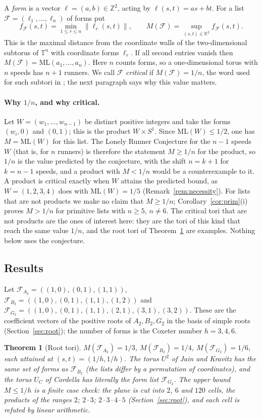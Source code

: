 \documentclass[11pt]{amsart}
\newtheorem{theorem}{Theorem}
\theoremstyle{definition}
\theoremstyle{remark}
\newcommand{\R}{\mathbb{R}}
\newcommand{\Z}{\mathbb{Z}}
\newcommand{\T}{\mathbb{T}}
\newcommand{\dist}[1]{\lVert #1\rVert}
\newcommand{\ML}{\mathrm{ML}}
\begin{document}
A \emph{form} is a vector $\ell=(a,b)\in\Z^2$, acting by $\ell(s,t)=as+bt$. For a list $\mathcal F=(\ell_1,\dots,\ell_n)$ of forms put
\[
f_{\mathcal F}(s,t)=\min_{1\le r\le n}\dist{\ell_r(s,t)},\qquad M(\mathcal F)=\sup_{(s,t)\in\R^2} f_{\mathcal F}(s,t).
\]
This is the maximal distance from the coordinate walls of the two-dimensional subtorus of $\T^n$ with coordinate forms $\ell_r$. If all second entries vanish then $M(\mathcal F)=\ML(a_1,\dots,a_n)$. Here $n$ counts forms, so a one-dimensional torus with $n$ speeds has $n+1$ runners. We call $\mathcal F$ \emph{critical} if $M(\mathcal F)=1/n$, the word used for such subtori in \cite{Cordella,YGB}; the next paragraph says why this value matters.

\paragraph{Why $1/n$, and why critical.} Let $W=(w_1,\dots,w_{n-1})$ be distinct positive integers and take the forms $(w_i,0)$ and $(0,1)$; this is the product $W\times S^1$. Since $\ML(W)\le1/2$, one has $M=\ML(W)$ for this list. The Lonely Runner Conjecture for the $n-1$ speeds $W$ (that is, for $n$ runners) is therefore the statement $M\ge1/n$ for the product, so $1/n$ is the value predicted by the conjecture, with the shift $n=k+1$ for $k=n-1$ speeds, and a product with $M<1/n$ would be a counterexample to it. A product is critical exactly when $W$ attains the predicted bound, as $W=(1,2,3,4)$ does with $\ML(W)=1/5$ (Remark~\ref{rem:necessity}). For lists that are not products we make no claim that $M\ge1/n$; Corollary~\ref{cor:prim}(i) proves $M>1/n$ for primitive lists with $n\ge5$, $n\ne6$. The critical tori that are not products are the ones of interest here: they are the tori of this kind that reach the same value $1/n$, and the root tori of Theorem~\ref{thm:root} are examples. Nothing below uses the conjecture.

\subsection{Results}
Let $\mathcal F_{A_2}=((1,0),(0,1),(1,1))$, $\mathcal F_{B_2}=((1,0),(0,1),(1,1),(1,2))$ and $\mathcal F_{G_2}=((1,0),(0,1),(1,1),(2,1),(3,1),(3,2))$. These are the coefficient vectors of the positive roots of $A_2,B_2,G_2$ in the basis of simple roots (Section~\ref{sec:root}); the number of forms is the Coxeter number $h=3,4,6$.

\begin{theorem}[Root tori]\label{thm:root}
$M(\mathcal F_{A_2})=1/3$, $M(\mathcal F_{B_2})=1/4$, $M(\mathcal F_{G_2})=1/6$, each attained at $(s,t)=(1/h,1/h)$. The torus $U^2$ of Jain and Kravitz has the same set of forms as $\mathcal F_{B_2}$ (the lists differ by a permutation of coordinates), and the torus $U_C$ of Cordella has literally the form list $\mathcal F_{G_2}$. The upper bound $M\le1/h$ is a finite case check: the plane is cut into $2$, $6$ and $120$ cells, the products of the ranges $2$; $2\cdot3$; $2\cdot3\cdot4\cdot5$ (Section~\ref{sec:root}), and each cell is refuted by linear arithmetic.
\end{theorem}
\end{document}
